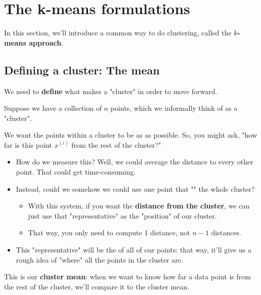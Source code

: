 \pagebreak

\section{The k-means formulations}

    In this section, we'll introduce a common way to do clustering, called the \textbf{$k$-means approach}.

    \subsection{Defining a cluster: The mean}
        
        We need to \textbf{define} what makes a "cluster" in order to move forward.

        Suppose we have a collection of $n$ points, which we informally think of as a "cluster".
        
        We want the points within a cluster to be as  as possible. So, you might ask, "how far is this point $x^{(i)}$ from the rest of the cluster?"

        \begin{itemize}
            \item How do we measure this? Well, we could average the distance to every other point. That could get time-consuming.

            \item Instead, could we somehow we could use one point that "" the whole cluster?

            \begin{itemize}
                \item With this system, if you want the \textbf{distance from the cluster}, we can just use that "representative" as the "position" of our cluster.
                \item That way, you only need to compute 1 distance, not $n-1$ distances.
            \end{itemize}

            \item This "representative" will be the  of all of our points: that way, it'll give us a rough idea of "where" all the points in the cluster are.
        \end{itemize}
        
        This is our \textbf{cluster mean}: when we want to know how far  a data point is from the rest of the cluster, we'll compare it to the cluster mean.\\
        
